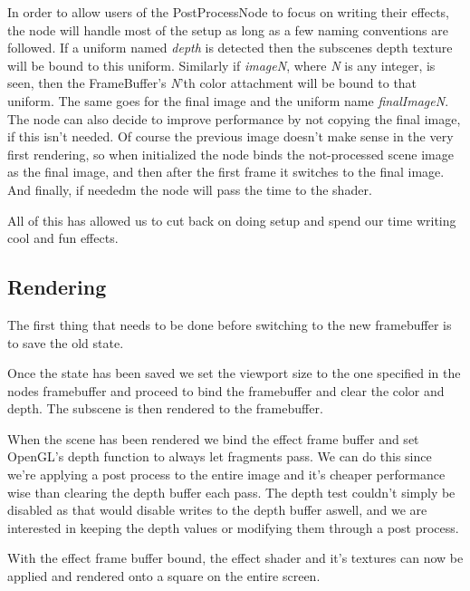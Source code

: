 In order to allow users of the PostProcessNode to focus on writing
their effects, the node will handle most of the setup as long as a few
naming conventions are followed. If a uniform named \textit{depth} is
detected then the subscenes depth texture will be bound to this
uniform. Similarly if \textit{imageN}, where \textit{N} is any
integer, is seen, then the FrameBuffer's \textit{N}'th color
attachment will be bound to that uniform. The same goes for the final
image and the uniform name \textit{finalImageN}. The node can also
decide to improve performance by not copying the final image, if this
isn't needed. Of course the previous image doesn't make sense in the
very first rendering, so when initialized the node binds the
not-processed scene image as the final image, and then after the first
frame it switches to the final image. And finally, if neededm the node will pass
the time to the shader.

All of this has allowed us to cut back on doing setup and spend our
time writing cool and fun effects.

\subsection*{Rendering}


The first thing that needs to be done before switching to the new
framebuffer is to save the old state. 




Once the state has been saved we set the viewport size to the one
specified in the nodes framebuffer and proceed to bind the framebuffer
and clear the color and depth. The subscene is then rendered to the
framebuffer.


When the scene has been rendered we bind the effect frame buffer and
set OpenGL's depth function to always let fragments pass. We can do
this since we're applying a post process to the entire image and it's
cheaper performance wise than clearing the depth buffer each pass. The
depth test couldn't simply be disabled as that would disable writes to
the depth buffer aswell, and we are interested in keeping the depth
values or modifying them through a post process.

With the effect frame buffer bound, the effect shader and it's
textures can now be applied and rendered onto a square on the entire
screen.

